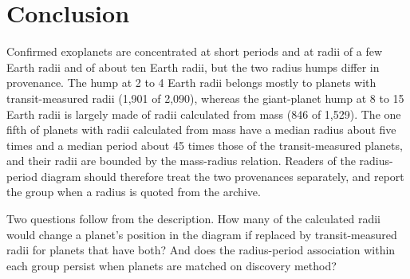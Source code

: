 \documentclass[11pt]{article}
\begin{document}
\section{Conclusion}

Confirmed exoplanets are concentrated at short periods and at radii of a few Earth radii and of about ten Earth radii, but the two radius humps differ in provenance. The hump at 2 to 4 Earth radii belongs mostly to planets with transit-measured radii (1,901 of 2,090), whereas the giant-planet hump at 8 to 15 Earth radii is largely made of radii calculated from mass (846 of 1,529). The one fifth of planets with radii calculated from mass have a median radius about five times and a median period about 45 times those of the transit-measured planets, and their radii are bounded by the mass-radius relation. Readers of the radius-period diagram should therefore treat the two provenances separately, and report the group when a radius is quoted from the archive.

Two questions follow from the description. How many of the calculated radii would change a planet's position in the diagram if replaced by transit-measured radii for planets that have both? And does the radius-period association within each group persist when planets are matched on discovery method?



\end{document}
